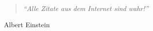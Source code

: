 
\thispagestyle{empty}

\vspace*{\fill}

\begin{center}
	\begin{minipage}{.75\textwidth}
		\begin{quotation}
			\textit{\enquote{Alle Zitate aus dem Internet sind wahr!}}
		\end{quotation}
		\hfill \textsf{Albert Einstein}
	\end{minipage}
\end{center}